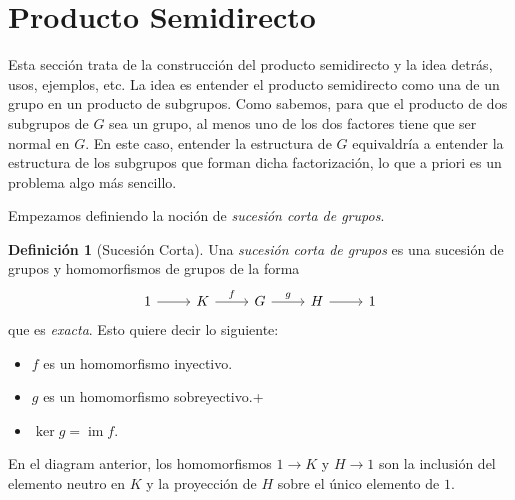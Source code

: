 \documentclass[a4paper,11pt]{amsart}
\DeclareMathOperator{\im}{im}
\theoremstyle{plain}
\theoremstyle{definition}
\newtheorem{defi}[thm]{Definición}
\theoremstyle{remark}
\begin{document}
\section{Producto Semidirecto}


Esta sección trata de la construcción del producto semidirecto y la idea detrás, usos, ejemplos, etc. La idea es entender el producto semidirecto como una  de un grupo en un producto de subgrupos. Como sabemos, para que el producto de dos subgrupos de $G$ sea un grupo, al menos uno de los dos factores tiene que ser normal en $G$. En este caso, entender la estructura de $G$ equivaldría a entender la estructura de los subgrupos que forman dicha factorización, lo que a priori es un problema algo más sencillo. 

Empezamos definiendo la noción de \textit{sucesión corta de grupos}. 

\begin{defi}[Sucesión Corta]
Una \textit{sucesión corta de grupos} es una sucesión de grupos y homomorfismos de grupos de la forma 
\begin{equation}
\label{sucesion_corta}
    \begin{tikzcd}
    1 \arrow[r] & K \arrow[r, "f"] & G \arrow[r, "g"] & H \arrow[r] & 1
    \end{tikzcd}
\end{equation}
que es \textit{exacta}. Esto quiere decir lo siguiente: 
\begin{itemize}
    \item $f$ es un homomorfismo inyectivo.
    \item $g$ es un homomorfismo sobreyectivo.+
    \item $\ker g = \im f$.
\end{itemize}
En el diagram anterior, los homomorfismos $1 \to K$ y $H \to 1$ son la inclusión del elemento neutro en $K$ y la proyección de $H$ sobre el único elemento de $1$. 
\end{defi}
\end{document}
